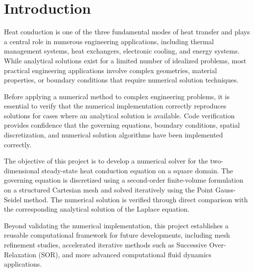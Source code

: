 
\section{Introduction}

Heat conduction is one of the three fundamental modes of heat transfer and plays a central role in numerous engineering applications, including thermal management systems, heat exchangers, electronic cooling, and energy systems. While analytical solutions exist for a limited number of idealized problems, most practical engineering applications involve complex geometries, material properties, or boundary conditions that require numerical solution techniques.

Before applying a numerical method to complex engineering problems, it is essential to verify that the numerical implementation correctly reproduces solutions for cases where an analytical solution is available. Code verification provides confidence that the governing equations, boundary conditions, spatial discretization, and numerical solution algorithms have been implemented correctly.

The objective of this project is to develop a numerical solver for the two-dimensional steady-state heat conduction equation on a square domain. The governing equation is discretized using a second-order finite-volume formulation on a structured Cartesian mesh and solved iteratively using the Point Gauss-Seidel method. The numerical solution is verified through direct comparison with the corresponding analytical solution of the Laplace equation.

Beyond validating the numerical implementation, this project establishes a reusable computational framework for future developments, including mesh refinement studies, accelerated iterative methods such as Successive Over-Relaxation (SOR), and more advanced computational fluid dynamics applications.

